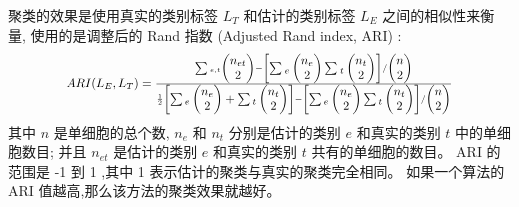 聚类的效果是使用真实的类别标签 $L_T$ 和估计的类别标签 $L_E$ 之间的相似性来衡量,
使用的是调整后的 Rand 指数 (Adjusted Rand index, ARI) :
\begin{equation}
\label{eq:ARI}
\resizebox{0.8\textwidth}{!}{$
    ARI(L_E,L_T)=\frac{\sum_{}{}_{e,t} \begin{pmatrix}n_{et}\\ 2\end{pmatrix} - \begin{bmatrix}  \sum_{}{}_{e} \begin{pmatrix}n_{e}\\ 2\end{pmatrix}\sum_{}{}_{t} \begin{pmatrix}n_{t}\\ 2\end{pmatrix}  \end{bmatrix} / \begin{pmatrix}n\\ 2\end{pmatrix} 
    }{\frac{1}{2}\begin{bmatrix}
    \sum{}{}_e\begin{pmatrix}n_{e}\\ 2\end{pmatrix} + \sum{}{}_t\begin{pmatrix}n_{t}\\ 2\end{pmatrix}
    \end{bmatrix} - \begin{bmatrix}
    \sum{}{}_e\begin{pmatrix}n_{e}\\ 2\end{pmatrix} \sum{}{}_t\begin{pmatrix}n_{t}\\ 2\end{pmatrix} 
    \end{bmatrix}/\begin{pmatrix}n\\ 2\end{pmatrix}}    
$}
\end{equation}
其中 $n$ 是单细胞的总个数, 
$n_e$ 和 $n_t$ 分别是估计的类别 $e$ 和真实的类别 $t$ 中的单细胞数目; 
并且 $n_{et}$ 是估计的类别 $e$ 和真实的类别 $t$ 共有的单细胞的数目。
ARI 的范围是 -1 到 1 ,其中 1 表示估计的聚类与真实的聚类完全相同。
如果一个算法的 ARI 值越高,那么该方法的聚类效果就越好。

